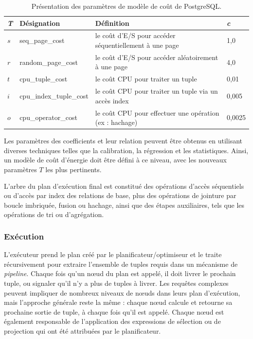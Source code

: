 \begin{table}
\centering
\caption {Présentation des paramètres de modèle de coût de PostgreSQL.} \label{tab:postgres-cost-param}
\begin{tabular}{llll}
    \toprule
    \textbf{\textit{T}} & \textbf{Désignation} & \textbf{Définition} & \textbf{\textit{c}} \\
    \midrule
    $s$ & seq\_page\_cost        & le coût d'E/S pour accéder séquentiellement à une page  & 1,0 \\
    $r$ & random\_page\_cost     & le coût d'E/S pour accéder aléatoirement à une page     & 4,0 \\
    $t$ & cpu\_tuple\_cost       & le coût CPU pour traiter un tuple                       & 0,01 \\
    $i$ & cpu\_index\_tuple\_cost & le coût CPU pour traiter un tuple via un accès index    & 0,005 \\
    $o$ & cpu\_operator\_cost    & le coût CPU pour effectuer une opération (ex : hachage) & 0,0025 \\
    \bottomrule
\end{tabular}
\end{table}

Les paramètres des coefficients et leur relation peuvent être obtenus en utilisant diverses techniques telles que la calibration, la régression et les statistiques. Ainsi, un modèle de coût d'énergie doit être défini à ce niveau, avec les nouveaux paramètres $T$ les plus pertinents.

L'arbre du plan d'exécution final est constitué des opérations d'accès séquentiels ou d'accès par index des relations de base, plus des opérations de jointure par boucle imbriquée, fusion ou hachage, ainsi que des étapes auxiliaires, tels que les opérations de tri ou d'agrégation.

\subsubsection{Exécution}\label{subsec:Executor}
L'exécuteur prend le plan créé par le planificateur/optimiseur et le traite récursivement pour extraire l'ensemble de tuples requis dans un mécanisme de \textit{pipeline}. Chaque fois qu'un nœud du plan est appelé, il doit livrer le prochain tuple, ou signaler qu'il n'y a plus de tuples à livrer. Les requêtes complexes peuvent impliquer de nombreux niveaux de nœuds dans leurs plan d'exécution, mais l'approche générale reste la même : chaque nœud calcule et retourne sa prochaine sortie de tuple, à chaque fois qu'il est appelé. Chaque nœud est également responsable de l'application des expressions de sélection ou de projection qui ont été attribuées par le planificateur.

